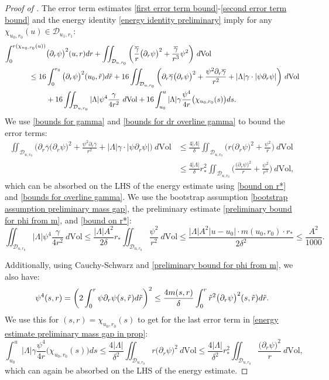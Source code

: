 \documentclass[11pt]{article}
\numberwithin{equation}{section}
\begin{document}
\begin{proof}[Proof of ]
The error term estimates \eqref{first error term bound}-\eqref{second error term bound} and the energy identity \eqref{energy identity preliminary} imply for any $\chi_{u_0,r_0}(u)\in\mathcal{D}_{u_1,r_1}$:
\begin{align}
    \int_0^{r(\chi_{u_0,r_0}(u))}&\big(\partial_r\psi\big)^2(u,r)dr+\iint_{\mathcal{D}_{u,r_0}}\bigg(\frac{\overline{\gamma}}{r}\big(\partial_r\psi\big)^2+\frac{\overline{\gamma}}{r^3}\psi^2\bigg)\ d\mathrm{Vol}\label{energy estimate preliminary mass gap in prop}\\
    \leq16&\int_0^{r_0}\big(\partial_r\psi\big)^2(u_0,\Tilde{r})d\Tilde{r}+16\iint_{\mathcal{D}_{u,r_0}}\bigg(\partial_r\overline{\gamma}\big(\partial_r\psi\big)^2+\frac{\psi^2\partial_r\overline{\gamma}}{r^2}+|\Lambda|\gamma\cdot|\psi\partial_r\psi|\bigg)\ d\mathrm{Vol}\notag\\
    &+16\iint_{\mathcal{D}_{u,r_0}}|\Lambda|\psi^4\frac{\gamma}{4r^2}\ d\mathrm{Vol}+16\int_{u_0}^u|\Lambda|\gamma\frac{\psi^4}{4r}\big(\chi_{u_0,r_0}(s)\big)ds.\notag
\end{align}
We use \eqref{bounds for gamma} and \eqref{bounds for dr overline gamma} to bound the error terms:
\begin{align*}
\iint_{\mathcal{D}_{u,r_0}}\bigg(\partial_r\overline{\gamma}\big(\partial_r\psi\big)^2+\frac{\psi^2\partial_r\overline{\gamma}}{r^2}+|\Lambda|\gamma\cdot|\psi\partial_r\psi|\bigg)\ d\mathrm{Vol}&\leq \frac{4|\Lambda|}{\delta}\iint_{\mathcal{D}_{u,r_0}}\bigg(r\big(\partial_r\psi\big)^2+\frac{\psi^2}{r}\bigg)\ d\mathrm{Vol}\\
    &\leq\frac{4|\Lambda|}{\delta}r_*^2\iint_{\mathcal{D}_{u,r_0}}\bigg(\frac{\big(\partial_r\psi\big)^2}{r}+\frac{\psi^2}{r^3}\bigg)\ d\mathrm{Vol},
\end{align*}
which can be absorbed on the LHS of the energy estimate using \eqref{bound on r*} and \eqref{bounds for overline gamma}. We use the bootstrap assumption \eqref{bootstrap assumption preliminary mass gap}, the preliminary estimate \eqref{preliminary bound for phi from m}, and \eqref{bound on r*}:
\[\iint_{\mathcal{D}_{u,r_0}}|\Lambda|\psi^4\frac{\gamma}{4r^2}\ d\mathrm{Vol}\leq\frac{|\Lambda|A^2}{2\delta}r_*\iint_{\mathcal{D}_{u,r_0}}\frac{\psi^2}{r^2}\ d\mathrm{Vol}\leq\frac{|\Lambda|A^2|u-u_0|\cdot m(u_0,r_0)\cdot r_*}{2\delta^2}\leq\frac{A^2}{1000}.\]

Additionally, using Cauchy-Schwarz and \eqref{preliminary bound for phi from m}, we also have:
\[\psi^4(s,r)=\bigg(2\int_0^r\psi\partial_r\psi(s,\Tilde{r})d\Tilde{r}\bigg)^2\leq\frac{4m(s,r)}{\delta}\int_0^r\Tilde{r}^2\big(\partial_r\psi\big)^2(s,\Tilde{r})d\Tilde{r}.\]
We use this for $(s,r)=\chi_{u_0,r_0}(s)$ to get for the last error term in \eqref{energy estimate preliminary mass gap in prop}:
\[\int_{u_0}^u|\Lambda|\gamma\frac{\psi^4}{4r}\big(\chi_{u_0,r_0}(s)\big)ds\leq\frac{4|\Lambda|}{\delta^2}\iint_{\mathcal{D}_{u,r_0}}r\big(\partial_r\psi\big)^2\ d\mathrm{Vol}\leq\frac{4|\Lambda|}{\delta^2}r_*^2\iint_{\mathcal{D}_{u,r_0}}\frac{\big(\partial_r\psi\big)^2}{r}\ d\mathrm{Vol},\]
which can again be absorbed on the LHS of the energy estimate. 


\end{proof}
\end{document}
